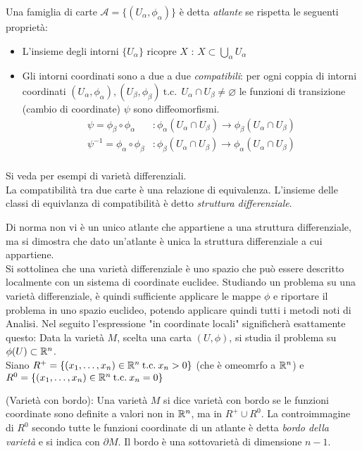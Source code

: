 Una famiglia di carte $\mathcal{A} = \{ (U_\alpha , \phi_\alpha) \}$ è detta
\emph{atlante} se rispetta le seguenti proprietà:
\begin{itemize}
    \item L'insieme degli intorni $\{U_\alpha\}$ ricopre $X$ :
        $X \subset \bigcup \limits_\alpha U_\alpha$
    \item Gli intorni coordinati sono a due a due \emph{compatibili}: per ogni coppia
    di intorni coordinati
       $(U_\alpha , \phi_\alpha), (U_\beta , \phi_\beta) \mathrm{\:t.c.\:} \:
       U_\alpha \cap U_\beta \neq \varnothing $
    le funzioni di transizione (cambio di coordinate) $\psi$ sono diffeomorfismi.
    \begin{equation*}
        \begin{split}
           \psi = \phi_\beta \circ \phi_\alpha &: \phi_\alpha(U_\alpha \cap U_\beta)
              \to \phi_\beta (U_\alpha \cap U_\beta) \\
           \psi^{-1} = \phi_\alpha \circ \phi_\beta &: \phi_\beta(U_\alpha \cap U_\beta)
              \to \phi_\alpha (U_\alpha \cap U_\beta) \\
        \end{split}
    \end{equation*}
\end{itemize}
Si veda \cite{sernesi} per esempi di varietà differenziali.\\

La compatibilità tra due carte è una relazione di equivalenza. L'insieme delle
classi di equivlanza di compatibilità è detto \emph{struttura differenziale}.

Di norma non vi è un unico atlante che appartiene a una struttura differenziale,
ma si dimostra che dato un'atlante è unica la struttura differenziale a cui appartiene.\\

Si sottolinea che una varietà differenziale è uno spazio che può essere descritto
localmente con un sistema di coordinate euclidee. Studiando un problema su una
varietà differenziale, è quindi sufficiente applicare le mappe $\phi$ e riportare
il problema in uno spazio euclideo, potendo applicare quindi tutti i metodi
noti di Analisi. Nel seguito l'espressione "in coordinate locali" significherà esattamente
questo: Data la varietà $M$, scelta una carta $(U,\phi)$, si studia il problema
su $\phi(U) \subset \mathbb{R} ^n$.\\

Siano $R^+ = \{(x_1, \dots, x_n) \in \mathbb{R}^n \mathrm{\: t.c. \:} x_n > 0 \}$ (che è omeomrfo a $\mathbb{R}^n$) e
$R^0 = \{(x_1, \dots, x_n) \in \mathbb{R}^n \mathrm{\: t.c. \:} x_n = 0 \}$
\begin{definition}{(Varietà con bordo):}
   Una varietà $M$ si dice varietà con bordo se le funzioni coordinate sono definite
   a valori non in $\mathbb{R}^n$, ma in $R^+ \cup R^0$. La controimmagine di $R^0$ secondo
   tutte le funzioni coordinate di un atlante è detta \emph{bordo della varietà}
   e si indica con $\partial M$. Il bordo è una sottovarietà di dimensione $n-1$.
\end{definition}

